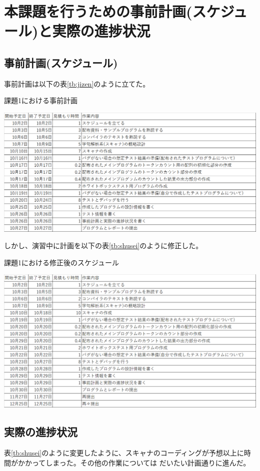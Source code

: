 \documentclass{jarticle}
\begin{document}
\section{本課題を行うための事前計画(スケジュール)と実際の進捗状況}
\subsection{事前計画(スケジュール)}
事前計画は以下の表\ref{tb:jizen}のように立てた。
\begin{table}[H]
\begin{center}
\caption{課題1における事前計画}
\label{tb:jizen}
\includegraphics[scale=0.6]{kadai1.png}
\end{center}
\end{table}

しかし、演習中に計画を以下の表\ref{tb:shusei}のように修正した。
\begin{table}[H]
\begin{center}
\caption{課題1における修正後のスケジュール}
\label{tb:shusei}
\includegraphics[scale=0.6]{kadai1-2.png}
\end{center}
\end{table}
\subsection{実際の進捗状況}
表\ref{tb:shusei}のように変更したように、スキャナのコーディングが予想以上に時間がかかってしまった。その他の作業については
だいたい計画通りに進んだ。
\end{document}
